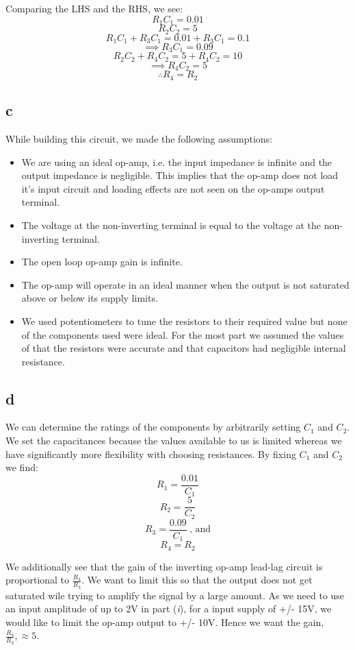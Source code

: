 \documentclass{article}
\theoremstyle{plain}
\theoremstyle{definition}
\theoremstyle{remark}
\begin{document}
Comparing the LHS and the RHS, we see:
$$R_1C_1 = 0.01$$
$$R_2C_2 = 5$$
$$R_1C_1 + R_3C_1 = 0.01 + R_3C_1 = 0.1$$
$$\implies R_3C_1 = 0.09$$
$$R_2C_2 + R_4C_2 = 5 + R_4C_2 = 10$$
$$\implies R_4C_2 = 5$$
$$\therefore R_4 = R_2$$

\subsection*{c}
While building this circuit, we made the following assumptions:
\begin{itemize}
\item We are using an ideal op-amp, i.e. the input impedance is infinite and the output impedance is negligible. This implies that the op-amp does not load it's input circuit and loading effects are not seen on the op-amps output terminal.

\item The voltage at the non-inverting terminal is equal to the voltage at the non-inverting terminal.

\item The open loop op-amp gain is infinite.

\item The op-amp will operate in an ideal manner when the output is not saturated above or below its supply limits.

\item We used potentiometers to tune the resistors to their required value but none of the components used were ideal. For the most part we assumed the values of that the resistors were accurate and that capacitors had negligible internal resistance.

\end{itemize}

\subsection*{d}
We can determine the ratings of the components by arbitrarily setting $C_1$ and $C_2$. We set the capacitances because the values available to us is limited whereas we have significantly more flexibility with choosing resistances. By fixing $C_1$ and $C_2$ we find:
$$R_1 = \frac{0.01}{C_1}$$
$$R_2 = \frac{5}{C_2}$$
$$R_3 = \frac{0.09}{C_1} \ \text{,  and}$$
$$R_4 = R_2$$

We additionally see that the gain of the inverting op-amp lead-lag circuit is proportional to $ \frac{R_4}{R_3}$. We  want to limit this so that the output does not get saturated wile trying to amplify the signal by a large amount. As we need to use an input amplitude of up to 2V in part (\emph{i}), for a input supply of +/- 15V, we would like to limit the op-amp output to +/- 10V. Hence we want the gain,$ \frac{R_4}{R_3}, \approx 5$. 
\end{document}
